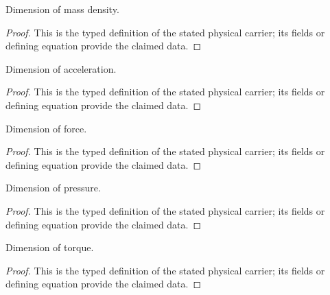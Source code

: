 \begin{definition}
  \label{def:physics:IPhO_2026_1_A_1:aux003}
  Dimension of mass density.
\end{definition}
\begin{proof}
  This is the typed definition of the stated physical carrier; its fields or defining equation provide the claimed data.
\end{proof}

\begin{definition}
  \label{def:physics:IPhO_2026_1_A_1:aux004}
  Dimension of acceleration.
\end{definition}
\begin{proof}
  This is the typed definition of the stated physical carrier; its fields or defining equation provide the claimed data.
\end{proof}

\begin{definition}
  \label{def:physics:IPhO_2026_1_A_1:aux005}
  Dimension of force.
\end{definition}
\begin{proof}
  This is the typed definition of the stated physical carrier; its fields or defining equation provide the claimed data.
\end{proof}

\begin{definition}
  \label{def:physics:IPhO_2026_1_A_1:aux006}
  Dimension of pressure.
\end{definition}
\begin{proof}
  This is the typed definition of the stated physical carrier; its fields or defining equation provide the claimed data.
\end{proof}

\begin{definition}
  \label{def:physics:IPhO_2026_1_A_1:aux007}
  Dimension of torque.
\end{definition}
\begin{proof}
  This is the typed definition of the stated physical carrier; its fields or defining equation provide the claimed data.
\end{proof}

